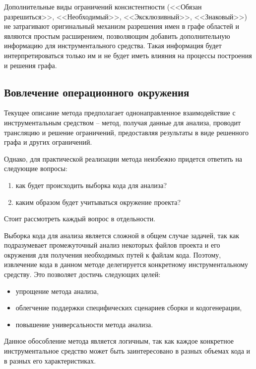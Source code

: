 Дополнительные виды ограничений консистентности (<<Обязан разрешиться>>, <<Необходимый>>, <<Эксклюзивный>>, <<Знаковый>>) не затрагивают
оригинальный механизм разрешения имен в графе областей и являются простым расширением, позволяющим добавить
дополнительную информацию для инструментального средства. Такая информация будет интерпретироваться только
им и не будет иметь влияния на процессы построения и решения графа.
\subsection{Вовлечение операционного окружения}

Текущее описание метода предполагает однонаправленное взаимодействие с инструментальным средством -- метод,
получая данные для анализа, проводит трансляцию и решение ограничений, предоставляя результаты в виде решенного
графа и других ограничений.

Однако, для практической реализации метода неизбежно придется ответить на следующие вопросы:
\begin{enumerate}[1.]
    \item как будет происходить выборка кода для анализа?
    \item каким образом будет учитываться окружение проекта?
\end{enumerate}
Стоит рассмотреть каждый вопрос в отдельности.

Выборка кода для анализа является сложной в общем случае задачей, так как подразумевает
промежуточный анализ некоторых файлов проекта и его окружения для получения необходимых
путей к файлам кода. Поэтому, извлечение кода в данном методе делегируется конкретному инструментальному
средству. Это позволяет достичь следующих целей:
\begin{itemize}
    \item упрощение метода анализа,
    \item облегчение поддержки специфических сценариев сборки и кодогенерации,
    \item повышение универсальности метода анализа.
\end{itemize}

Данное обособление метода является логичным, так как каждое конкретное инструментальное
средство может быть заинтересовано в разных объемах кода и в разных его характеристиках.

